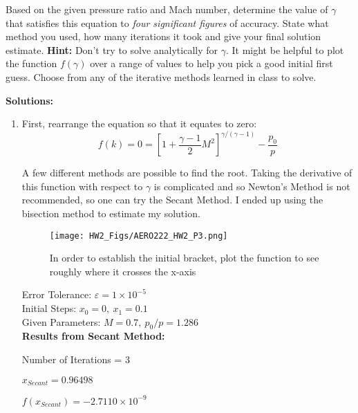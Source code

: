\documentclass[12pt]{article}
\begin{document}
\begin{description}
		Based on the given pressure ratio and Mach number, determine the value of $\gamma$ that satisfies this equation to \emph{four significant figures} of accuracy. State what method you used, how many iterations it took and give your final solution estimate. \textbf{Hint:} Don't try to solve analytically for $\gamma$. It might be helpful to plot the function $f(\gamma)$ over a range of values to help you pick a good initial first guess. Choose from any of the iterative methods learned in class to solve.
		
		\ifsolution
		\color{red}
		\textbf{Solutions:}
		\begin{enumerate} [label=(\alph*)]
			\item 	
			First, rearrange the equation so that it equates to zero:
			\begin{equation*}
			f(k) = 0 = \left[ 1 + \frac{\gamma-1}{2}M^2 \right]^{\gamma/(\gamma-1)} - \frac{p_0}{p}
			\end{equation*}
			
			A few different methods are possible to find the root. Taking the derivative of this function with respect to $\gamma$ is complicated and so Newton's Method is not recommended, so one can try the Secant Method. I ended up using the bisection method to estimate my solution.
			
			\begin{figure}[ht]
				\centering\texttt{[image: HW2\_Figs/AERO222\_HW2\_P3.png]}
				\caption{In order to establish the initial bracket, plot the function to see roughly where it crosses the x-axis}
				\label{fig:PitotPlot}
			\end{figure}
			
			Error Tolerance: $\varepsilon = 1 \times 10^{-5}$ \\
			Initial Steps: $x_{0} = 0, \ x_{1} = 0.1$ \\
			Given Parameters: $M = 0.7, \ p_0/p = 1.286$ \\
			
			\textbf{Results from Secant Method:}
			
			Number of Iterations = 3
			
			$x_{Secant} = 0.96498$
			
			$f(x_{Secant}) = -2.7110 \times 10^{-9}$
		\end{enumerate}
		\color{black}
		\fi
		

\end{description}
\end{document}
